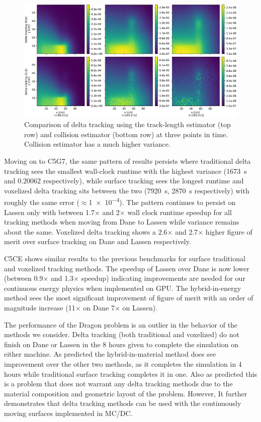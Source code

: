 \begin{figure}
    \centering
    \includegraphics[width=\textwidth]{monte_carlo/delta_tracking/figures/cle_v_tle.pdf}
    \caption{Comparison of delta tracking using the track-length estimator (top row) and collision estimator (bottom row) at three points in time. Collision estimator has a much higher variance.}
    \label{fig:koby}
\end{figure}

Moving on to C5G7, the same pattern of results persists where traditional delta tracking sees the smallest wall-clock runtime with the highest variance (\SI{1673}{\s} and \num{0.20062} respectively), while surface tracking sees the longest runtime and voxelized delta tracking sits between the two (\SI{7920}{\s}, \SI{2870}{\s} respectively) with roughly the same error ($\approx$\num{1e-4}).
The pattern continues to persist on Lassen only with between \num{1.7}$\times$ and \num{2}$\times$ wall clock runtime speedup for all tracking methods when moving from Dane to Lassen while variance remains about the same.
Voxelized delta tracking shows a \num{2.6}$\times$ and \num{2.7}$\times$ higher figure of merit over surface tracking on Dane and Lassen respectively.

C5CE shows similar results to the previous benchmarks for surface traditional and voxelized tracking methods.
The speedup of Lassen over Dane is now lower (between \num{0.9}$\times$ and \num{1.3}$\times$ speedup) indicating improvements are needed for our continuous energy physics when implemented on GPU.
The hybrid-in-energy method sees the most significant improvement of figure of merit with an order of magnitude increase (\num{11}$\times$ on Dane \num{7}$\times$ on Lassen).


The performance of the Dragon problem is an outlier in the behavior of the methods we consider.
Delta tracking (both traditional and voxelized) do not finish on Dane or Lassen in the 8 hours given to complete the simulation on either machine.
As predicted the hybrid-in-material method does see improvement over the other two methods, as it completes the simulation in 4 hours while traditional surface tracking completes it in one.
Also as predicted this is a problem that does not warrant any delta tracking methods due to the material composition and geometric layout of the problem.
However, It further demonstrates that delta tracking methods can be used with the continuously moving surfaces implemented in MC/DC.


